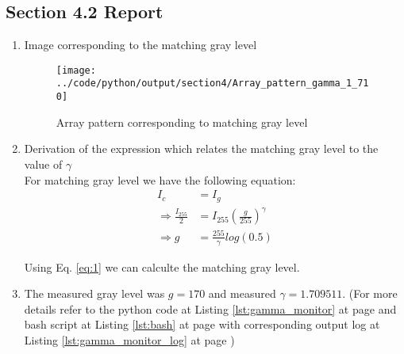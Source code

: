 \documentclass[a4paper,11pt]{article}
\newcommand{\refEq}[1]{Eq. \ref{#1}}
\newcommand{\reflst}[1]{Listing \ref{#1} at page \pageref{#1}}
\begin{document}
%
\clearpage
\vspace{2ex}
%
\subsection*{Section 4.2 Report} 
\begin{enumerate}
\item Image corresponding to the matching gray level
\begin{figure}[!hp]
 \centering
 \texttt{[image: ../code/python/output/section4/Array\_pattern\_gamma\_1\_710]}
 \caption{Array pattern corresponding to matching gray level}
\end{figure}

\item Derivation of the expression which relates the matching gray level to the value of $\gamma$\\

For matching gray level we have the following equation:
\begin{align}
 I_c &= I_g\nonumber\\
 \Rightarrow \frac{I_{255}}{2} &= I_{255}(\frac{g}{255})^{\gamma}\nonumber\\
 \Rightarrow g &= \frac{255}{\gamma}log(0.5)\label{eq:1}
\end{align}

Using \refEq{eq:1} we can calculte the matching gray level.

\item The measured gray level was $g=170$ and measured $\gamma=1.709511$. (For more details refer to the python code at \reflst{lst:gamma_monitor} and bash script at \reflst{lst:bash} with corresponding output log at \reflst{lst:gamma_monitor_log})

\end{enumerate}

%
\clearpage
\vspace{2ex}
%
\end{document}
